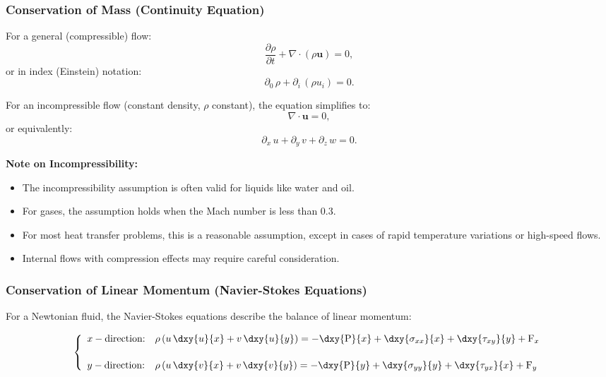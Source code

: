 \subsubsection*{Conservation of Mass (Continuity Equation)}
For a general (compressible) flow:
\[
    \frac{\partial \rho}{\partial t} + \nabla \cdot (\rho \mathbf{u}) = 0,
\]
or in index (Einstein) notation:
\[
    \partial_0\, \rho+ \partial_i\, (\rho u_i) = 0.
\]

For an incompressible flow (constant density, \(\rho\) constant), the equation simplifies to:
\[
    \nabla \cdot \mathbf{u} = 0,
\]
or equivalently:
\[
    \partial_x\, u +\partial_y\, v + \partial_z\, w = 0.
\]


\textbf{Note on Incompressibility:} 
\begin{itemize}
    \item The incompressibility assumption is often valid for liquids like water and oil.
    \item For gases, the assumption holds when the Mach number is less than 0.3.
    \item For most heat transfer problems, this is a reasonable assumption, except in cases of rapid temperature variations or high-speed flows.
    \item Internal flows with compression effects may require careful consideration.
\end{itemize}
\subsubsection*{Conservation of Linear Momentum (Navier-Stokes Equations)}
For a Newtonian fluid, the Navier-Stokes equations describe the balance of linear momentum:

\textbf{}

\[
    \left\{\begin{array}{ll}
        x-\text{direction:} &
        \rho\left(u\,\dxy{u}{x} + v\,\dxy{u}{y}\right)
        =-\dxy{\operatorname{{P}}}{x} 
        +\dxy{\sigma_{xx}}{x}
        + \dxy{\tau_{xy}}{y}
        + \operatorname{F}_x
        \\[1.5em]
        y-\text{direction:} &
        \rho\left(u\,\dxy{v}{x} + v\,\dxy{v}{y}\right)
        = - \dxy{\operatorname{{P}}}{y} 
        + \dxy{\sigma_{yy}}{y}
        + \dxy{\tau_{yx}}{x}
        + \operatorname{F}_y
    \end{array}
    \right.
\]


